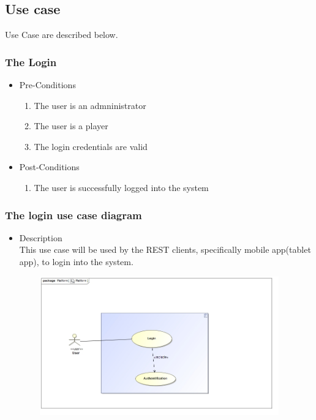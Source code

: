 \documentclass[english]{article}
\begin{document}
		
		\subsection{Use case}
		Use Case are described below.
		
		
		
		\subsubsection{The Login}
		\begin{itemize}
	
		
		\item Pre-Conditions
			\begin{enumerate}
				\item The user is an admninistrator
				\item The user is a player
				\item The login credentials are valid
			\end{enumerate}
		\item Post-Conditions
			\begin{enumerate}
			\item The user is successfully logged into the system
						
			\end{enumerate}
		
			
		

\end{itemize}

		\subsubsection* {The login use case diagram}
		\begin{itemize}
			\item Description\\
			This use case will be used by the REST clients, specifically mobile app(tablet app), to login into the system.
		\end{itemize}
		\includegraphics[width=14cm,height=6cm,keepaspectratio]{login.jpg}\\
		
\end{document}
